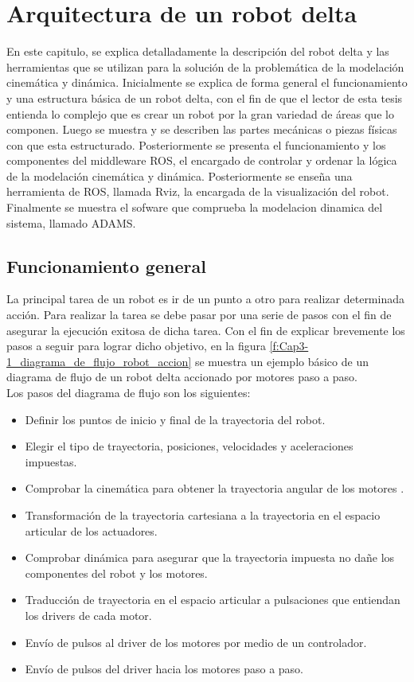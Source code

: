 \chapter{Arquitectura de un robot delta}\label{CAP3}

En este capitulo, se explica detalladamente la descripción del robot delta y las herramientas que se utilizan para la solución de la problemática de la modelación cinemática y dinámica. Inicialmente se explica de forma general el funcionamiento y una estructura básica de un robot delta, con el fin de que el lector de esta tesis entienda lo complejo que es crear un robot por la gran variedad de áreas que lo componen. Luego se muestra y se describen las partes mecánicas o piezas físicas con que esta estructurado. Posteriormente se presenta el funcionamiento y los componentes del middleware ROS, el encargado de controlar y ordenar la lógica de la modelación cinemática y dinámica. Posteriormente se enseña una herramienta de ROS, llamada Rviz, la encargada de la visualización del robot. Finalmente se muestra el sofware que comprueba la modelacion dinamica del sistema, llamado ADAMS.

\section{Funcionamiento general}

La principal tarea de un robot es ir de un punto a otro para realizar determinada acción. Para realizar la tarea se debe pasar por una serie de pasos con el fin de asegurar la ejecución exitosa de dicha tarea. Con el fin de explicar brevemente los pasos a seguir para lograr dicho objetivo, en la figura \ref{f:Cap3-1_diagrama_de_flujo_robot_accion} se muestra un ejemplo básico de un diagrama de flujo de un robot delta accionado por motores paso a paso.\\

Los pasos del diagrama de flujo son los siguientes:

\begin{itemize}
    \item Definir los puntos de inicio y final de la trayectoria del robot.
    \item Elegir el tipo de trayectoria, posiciones, velocidades y aceleraciones impuestas.
    \item Comprobar la cinemática para obtener la trayectoria angular de los motores .
    \item Transformación de la trayectoria cartesiana a la trayectoria en el espacio articular de los actuadores.    
    \item Comprobar dinámica para asegurar que la trayectoria impuesta no dañe los componentes del robot y los motores.
    \item Traducción de trayectoria en el espacio articular a pulsaciones que entiendan los drivers de cada motor.
    \item Envío de pulsos al driver de los motores por medio de un controlador.
    \item Envío de pulsos del driver hacia los motores paso a paso.
\end{itemize}

